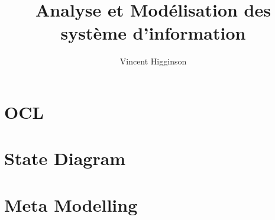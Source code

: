 \documentclass[french]{book}
\title{Analyse et Modélisation des système d'information}
\author{Vincent Higginson}
\begin{document}
\maketitle

\frontmatter
\maketitle
\tableofcontents

\mainmatter





\chapter{OCL}

\chapter{State Diagram}

\chapter{Meta Modelling}

\backmatter
\end{document}
